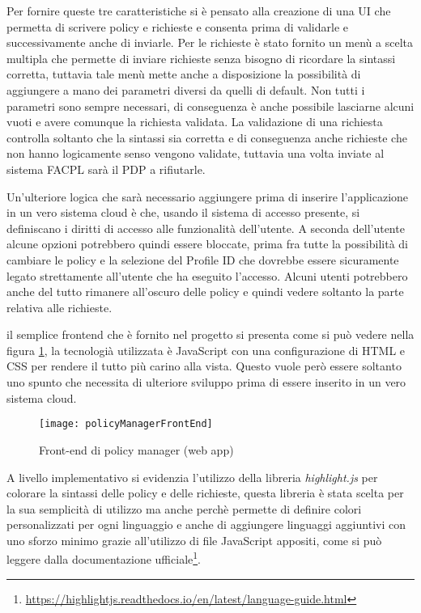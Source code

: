 Per fornire queste tre caratteristiche si è pensato alla creazione di una UI che permetta di scrivere policy e richieste e consenta prima di validarle e successivamente anche di inviarle. Per le richieste è stato fornito un menù a scelta multipla che permette di inviare richieste senza bisogno di ricordare la sintassi corretta, tuttavia tale menù mette anche a disposizione la possibilità di aggiungere a mano dei parametri diversi da quelli di default. Non tutti i parametri sono sempre necessari, di conseguenza è anche possibile lasciarne alcuni vuoti e avere comunque la richiesta validata. La validazione di una richiesta controlla soltanto che la sintassi sia corretta e di conseguenza anche richieste che non hanno logicamente senso vengono validate, tuttavia una volta inviate al sistema FACPL sarà il PDP a rifiutarle.\par
Un'ulteriore logica che sarà necessario aggiungere prima di inserire l'applicazione in un vero sistema cloud è che, usando il sistema di accesso presente, si definiscano i diritti di accesso alle funzionalità dell'utente. A seconda dell'utente alcune opzioni potrebbero quindi essere bloccate, prima fra tutte la possibilità di cambiare le policy e la selezione del Profile ID che dovrebbe essere sicuramente legato strettamente all'utente che ha eseguito l'accesso. Alcuni utenti potrebbero anche del tutto rimanere all'oscuro delle policy e quindi vedere soltanto la parte relativa alle richieste.\par
il semplice frontend che è fornito nel progetto si presenta come si può vedere nella figura \ref{fig:policyManagerFrontEnd}, la tecnologià utilizzata è JavaScript con una configurazione di HTML e CSS per rendere il tutto più carino alla vista. Questo vuole però essere soltanto uno spunto che necessita di ulteriore sviluppo prima di essere inserito in un vero sistema cloud.
\begin{figure}[H]
    \begin{center}
    \texttt{[image: policyManagerFrontEnd]}
    \caption{Front-end di policy manager (web app)}
    \label{fig:policyManagerFrontEnd}
    \end{center}
\end{figure}
A livello implementativo si evidenzia l'utilizzo della libreria \emph{highlight.js}\cite{highlightjs} per colorare la sintassi delle policy e delle richieste, questa libreria è stata scelta per la sua semplicità di utilizzo ma anche perchè permette di definire colori personalizzati per ogni linguaggio e anche di aggiungere linguaggi aggiuntivi con uno sforzo minimo grazie all'utilizzo di file JavaScript appositi, come si può leggere dalla documentazione ufficiale\footnote{\url{https://highlightjs.readthedocs.io/en/latest/language-guide.html}}.\par

